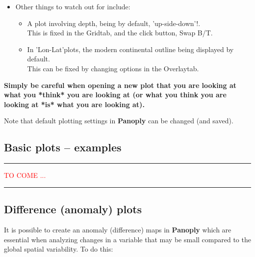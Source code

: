 \documentclass[11pt,fleqn]{book} %
\begin{document}
\begin{itemize}
\vspace{1mm}
\item Other things to watch out for include:
\begin{itemize}
\item A plot involving depth, being by default, 'up-side-down'!.
\\This is fixed in the \footnotesize\textsf{Grid}\normalsize tab, and the click button, \footnotesize\textsf{Swap B/T}\normalsize.
\item In \footnotesize\textsf{'Lon-Lat'}\normalsize plots, the modern continental outline being displayed by default.
\\This can be fixed by changing options in the \footnotesize\textsf{Overlay}\normalsize tab.
\end{itemize}

\end{itemize}
\vspace{2mm}

\begin{center}
\textbf{Simply be careful when opening a new plot that you are looking at what you *think* you are looking at (or what you think you are looking at *is* what you are looking at).}
\end{center}

Note that default plotting settings in \textbf{Panoply} can be changed (and saved).


\subsection{Basic plots -- examples}

\vspace{1mm}
\noindent\rule{4cm}{0.5pt}
\vspace{2mm}

\noindent\textcolor{red}{TO COME ...}

\vspace{1mm}
\noindent\rule{4cm}{0.5pt}
\vspace{2mm}


\subsection{Difference (anomaly) plots}

It is possible to create an anomaly (difference) maps in \textbf{Panoply} which are essential when analyzing changes in a variable that may be small compared to the global spatial variability. To do this:  
\end{document}
